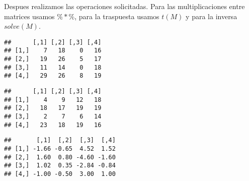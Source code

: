 \documentclass[
]{article}
\newenvironment{Shaded}{\begin{snugshade}}{\end{snugshade}}
\newcommand{\KeywordTok}[1]{\textcolor[rgb]{0.13,0.29,0.53}{\textbf{#1}}}
\newcommand{\NormalTok}[1]{#1}
\newcommand{\OperatorTok}[1]{\textcolor[rgb]{0.81,0.36,0.00}{\textbf{#1}}}
\newcommand{\StringTok}[1]{\textcolor[rgb]{0.31,0.60,0.02}{#1}}
\begin{document}
Despues realizamos las operaciones solicitadas. Para las
multiplicaciones entre matrices usamos \(\%*\%\), para la traspuesta
usamos \(t(M)\) y para la inversa \(solve(M)\).

\begin{Shaded}
\end{Shaded}

\begin{verbatim}
##      [,1] [,2] [,3] [,4]
## [1,]    7   18    0   16
## [2,]   19   26    5   17
## [3,]   11   14    0   18
## [4,]   29   26    8   19
\end{verbatim}

\begin{Shaded}
\end{Shaded}

\begin{verbatim}
##      [,1] [,2] [,3] [,4]
## [1,]    4    9   12   18
## [2,]   18   17   19   19
## [3,]    2    7    6   14
## [4,]   23   18   19   16
\end{verbatim}

\begin{Shaded}
\end{Shaded}

\begin{verbatim}
##       [,1]  [,2]  [,3]  [,4]
## [1,] -1.66 -0.65  4.52  1.52
## [2,]  1.60  0.80 -4.60 -1.60
## [3,]  1.02  0.35 -2.84 -0.84
## [4,] -1.00 -0.50  3.00  1.00
\end{verbatim}

\begin{Shaded}
\end{Shaded}
\end{document}
